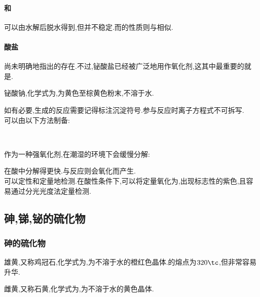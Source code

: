 \documentclass{ctexart}
\begin{document}
\paragraph{和}
可以由水解后脱水得到,但并不稳定.而的性质则与相似.
\paragraph{酸盐}
尚未明确地指出的存在.不过,铋酸盐已经被广泛地用作氧化剂,这其中最重要的就是.
\begin{substance}[\ce{NaBiO3}]
    铋酸钠,化学式为,为黄色至棕黄色粉末,不溶于水.
\end{substance}
如有必要,生成的反应需要记得标注沉淀符号.参与反应时离子方程式不可拆写.\\
\indent {}可以由以下方法制备:
\begin{center}
    \\
\end{center}
作为一种强氧化剂,在潮湿的环境下会缓慢分解:
\begin{center}
\end{center}
在酸中分解得更快.与反应则会氧化而产生.\\
\indent {}可以定性和定量地检测.在酸性条件下,可以将定量氧化为,出现标志性的紫色,且容易通过分光光度法定量检测.
\begin{center}
\end{center}
\subsection{砷,锑,铋的硫化物}
\subsubsection{砷的硫化物}
\begin{substance}[\ce{As4S4}]
    雄黄,又称鸡冠石,化学式为,为不溶于水的橙红色晶体.的熔点为$320\tc$,但非常容易升华.
\end{substance}
\begin{substance}[\ce{As2S3}]
    雌黄\footnotemark,又称石黄,化学式为,为不溶于水的黄色晶体.
\end{substance}
\end{document}
